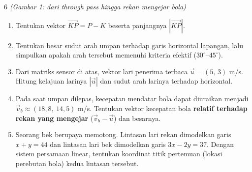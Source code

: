 \documentclass[11pt]{article}
\newenvironment{subsoal}{%
  \begin{enumerate}[label=\textbf{(\alph*)},leftmargin=1.8em,itemsep=5pt,topsep=3pt]}%
  {\end{enumerate}}
\begin{document}
\begin{soal}{6 \normalfont\itshape(Gambar 1: dari \textit{through pass} hingga rekan mengejar bola)}
\begin{subsoal}
  \item Tentukan vektor $\vec{KP}=P-K$ beserta panjangnya $|\vec{KP}|$.
  \item Tentukan besar sudut arah umpan terhadap garis horizontal lapangan, lalu
        simpulkan apakah arah tersebut memenuhi kriteria efektif ($30^\circ$--$45^\circ$).
  \item Dari matriks sensor di atas, vektor lari penerima terbaca $\vec{u}=(5,\,3)$
        m/s. Hitung kelajuan larinya $|\vec{u}|$ dan sudut arah larinya terhadap horizontal.
  \item Pada saat umpan dilepas, kecepatan mendatar bola dapat diuraikan menjadi
        $\vec{v}_b\approx(18{,}8,\ 14{,}5)$ m/s. Tentukan vektor kecepatan bola
        \textbf{relatif terhadap rekan yang mengejar} ($\vec{v}_b-\vec{u}$) dan besarnya.
  \item Seorang bek berupaya memotong. Lintasan lari rekan dimodelkan garis
        $x+y=44$ dan lintasan lari bek dimodelkan garis $3x-2y=37$. Dengan
        sistem persamaan linear, tentukan koordinat titik pertemuan (lokasi
        perebutan bola) kedua lintasan tersebut.
\end{subsoal}
\end{soal}
\end{document}
